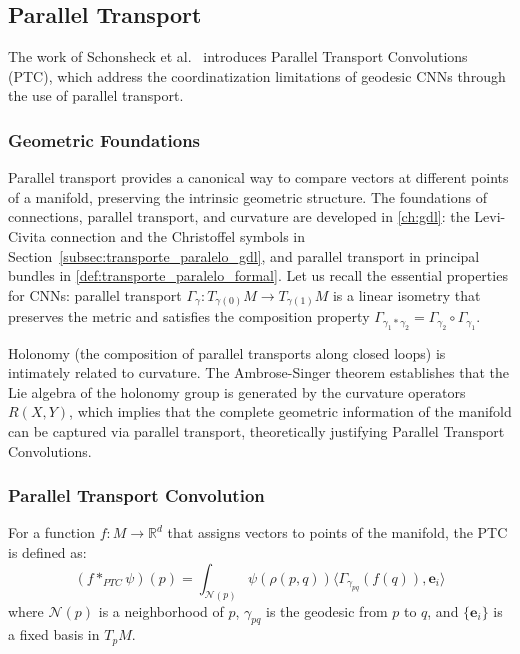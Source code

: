 \subsection{Parallel Transport}\label{subsec:transporte_paralelo}

The work of Schonsheck et al.~\citep{schonsheck2018parallel} introduces Parallel Transport Convolutions (PTC), which address the coordinatization limitations of geodesic CNNs through the use of parallel transport.

\subsubsection{Geometric Foundations}

Parallel transport provides a canonical way to compare vectors at different points of a manifold, preserving the intrinsic geometric structure. The foundations of connections, parallel transport, and curvature are developed in \autoref{ch:gdl}: the Levi-Civita connection and the Christoffel symbols in Section~\ref{subsec:transporte_paralelo_gdl}, and parallel transport in principal bundles in \autoref{def:transporte_paralelo_formal}. Let us recall the essential properties for CNNs: parallel transport $\Gamma_\gamma: T_{\gamma(0)}M \to T_{\gamma(1)}M$ is a linear isometry that preserves the metric and satisfies the composition property $\Gamma_{\gamma_1 * \gamma_2} = \Gamma_{\gamma_2} \circ \Gamma_{\gamma_1}$.

Holonomy (the composition of parallel transports along closed loops) is intimately related to curvature. The Ambrose-Singer theorem establishes that the Lie algebra of the holonomy group is generated by the curvature operators $R(X,Y)$, which implies that the complete geometric information of the manifold can be captured via parallel transport, theoretically justifying Parallel Transport Convolutions.

\subsubsection{Parallel Transport Convolution}

\begin{definition}[PTC]
For a function $f: M \to \mathbb{R}^d$ that assigns vectors to points of the manifold, the PTC is defined as:
\begin{equation}
(f *_{PTC} \psi)(p) = \int_{\mathcal{N}(p)} \psi(\rho(p,q)) \langle \Gamma_{\gamma_{pq}}(f(q)), \mathbf{e}_i \rangle
\end{equation}
where $\mathcal{N}(p)$ is a neighborhood of $p$, $\gamma_{pq}$ is the geodesic from $p$ to $q$, and $\{\mathbf{e}_i\}$ is a fixed basis in $T_p M$.
\end{definition}

